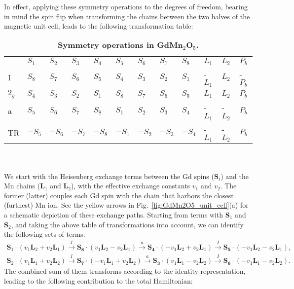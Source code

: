 In effect, applying these symmetry operations to the degrees of freedom, bearing in mind the spin flip when transforming the chains between the two halves of the magnetic unit cell, leads to the following transformation table:
\begin{table}[h]
\centering
\begin{tabular}{|l|lllllllllll|}
\cline{1-12}
 & $S_1$ & $S_2$ & $S_3$ & $S_4$ & $S_5$ & $S_6$ & $S_7$ & $S_8$ & $L_1$ & $L_2$ & $P_b$ \\ \cline{1-12}
I & $S_8$ & $S_7$ & $S_6$ & $S_5$ & $S_4$ & $S_3$ & $S_2$ & $S_1$ & -$L_1$ & $L_2$ & -$P_b$ \\ \cline{1-12}
$2_y$ & $S_4$ & $S_3$ & $S_2$ & $S_1$ & $S_8$ & $S_7$ & $S_6$ & $S_5$ & $L_1$ & $L_2$ & $P_b$ \\ \cline{1-12}
a & $S_5$ & $S_6$ & $S_7$ & $S_8$ & $S_1$ & $S_2$ & $S_3$ & $S_4$ & -$L_1$ & -$L_2$ & $P_b$ \\ \cline{1-12}
TR & $-S_5$ & $-S_6$ & $-S_7$ & $-S_8$ & $-S_1$ & $-S_2$ & $-S_3$ & $-S_4$ & -$L_1$ & -$L_2$ & $P_b$ \\ \cline{1-12}
\end{tabular}
\caption{\label{tab:GdMn2O5_symm}{\bf Symmetry operations in GdMn$_2$O$_5$.}}
\end{table}\\\\
We start with the Heisenberg exchange terms between the Gd spins ($\bm{S}_i$) and the Mn chains ($\bm{L}_1$ and $\bm{L}_2$), with the effective exchange constants $v_1$ and $v_2$.
The former (latter) couples each Gd spin with the chain that harbors the closest (furthest) Mn ion. See the yellow arrows in Fig.~\ref{fig:GdMn2O5_unit_cell}(a) for a schematic depiction of these exchange paths.
Starting from terms with $\bm{S}_1$ and $\bm{S}_2$, and taking the above table of transformations into account, we can identify the following sets of terms:
\begin{align}
	\bm{S}_1\cdot(v_1 \bm{L}_2 + v_2 \bm{L}_1) \xrightarrow{I} \bm{S_8}\cdot(v_1 \bm{L}_2 - v_2 \bm{L}_1) \xrightarrow{a} \bm{S_4} \cdot (- v_1 \bm{L}_2 + v_2 \bm{L}_1) \xrightarrow{I} \bm{S_5} \cdot (-v_1 \bm{L}_2 - v_2 \bm{L}_1), \nonumber\\
	\bm{S}_2\cdot(v_1 \bm{L}_1 + v_2 \bm{L}_2) \xrightarrow{I} \bm{S_7}\cdot(-v_1 \bm{L}_1 + v_2 \bm{L}_2) \xrightarrow{a} \bm{S_3} \cdot (v_1 \bm{L}_1 - v_2 \bm{L}_2) \xrightarrow{I} \bm{S_6} \cdot (-v_1 \bm{L}_1 - v_2 \bm{L}_2).
\end{align}
The combined sum of them transforms according to the identity representation, leading to the following contribution to the total Hamiltonian:
